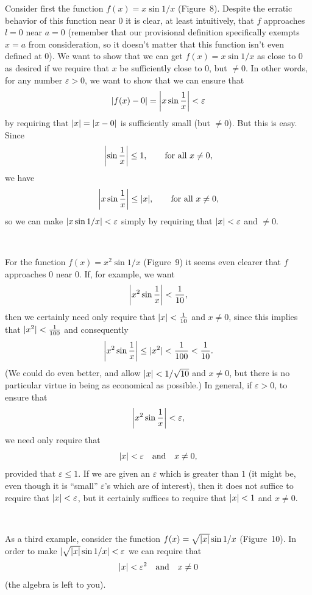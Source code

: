 Consider first the function $f(x)=x\sin 1/x$ (Figure~8). Despite the erratic
behavior of this function near $0$ it is clear, at least intuitively, that $f$
approaches $l=0$ near $a=0$ (remember that our provisional definition
specifically exempts $x=a$ from consideration, so it doesn't matter that this
function isn't even defined at $0$). We want to show that we can get
$f(x)=x\sin 1/x$ as close to $0$ as desired if we require that $x$ be
sufficiently close to $0$, but $\neq 0$. In other words, for any number
$\varepsilon>0$, we want to show that we can ensure that
\[
\abs{f(x)-0}=\abs*{x\sin\frac{1}{x}}<\varepsilon
\]
by requiring that $\abs{x}=\abs{x-0}$ is sufficiently small (but $\neq 0$).
But this is easy. Since
\[
\abs*{\sin\frac{1}{x}}\leq 1, \qquad\text{for all }x\neq 0,
\]
we have
\[
\abs*{x\sin\frac{1}{x}}\leq\abs{x}, \qquad\text{for all }x\neq 0,
\]
so we can make $\abs{x\sin 1/x}<\varepsilon$ simply by requiring that
$\abs{x}<\varepsilon$ and $\neq 0$.

\begin{center}
\\[0.6em]
\end{center}
For the function $f(x)=x^2\sin 1/x$ (Figure~9) it seems even clearer that $f$
approaches $0$ near $0$. If, for example, we want
\[
\abs*{x^2\sin\frac{1}{x}}<\frac{1}{10},
\]
then we certainly need only require that $\abs{x}<\frac{1}{10}$ and $x\neq 0$,
since this implies that $\abs{x^2}<\frac{1}{100}$ and consequently
\[
\abs*{x^2\sin\frac{1}{x}}\leq\abs{x^2}<\frac{1}{100}<\frac{1}{10}.
\]
(We could do even better, and allow $\abs{x}<1/\sqrt{10}$ and $x\neq 0$, but
there is no particular virtue in being as economical as possible.) In general,
if $\varepsilon>0$, to ensure that
\[
\abs*{x^2\sin\frac{1}{x}}<\varepsilon,
\]
we need only require that
\[
\abs{x}<\varepsilon \quad\text{and}\quad x\neq 0,
\]
provided that $\varepsilon\leq 1$. If we are given an $\varepsilon$ which is
greater than $1$ (it might be, even though it is ``small'' $\varepsilon$'s
which are of interest), then it does not suffice to require that
$\abs{x}<\varepsilon$, but it certainly suffices to require that
$\abs{x}<1$ and $x\neq 0$.

\begin{center}
\\[0.6em]
\end{center}
As a third example, consider the function $f(x)=\sqrt{\abs{x}}\sin 1/x$
(Figure~10). In order to make $\abs{\sqrt{\abs{x}}\sin 1/x}<\varepsilon$ we
can require that
\[
\abs{x}<\varepsilon^2 \quad\text{and}\quad x\neq 0
\]
(the algebra is left to you).

